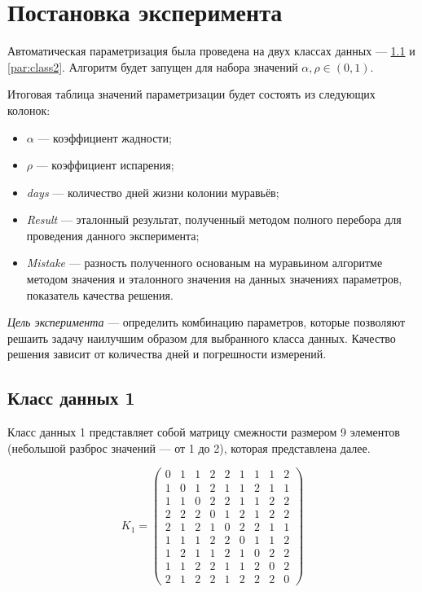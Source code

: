 \clearpage


\section{Постановка эксперимента}

Автоматическая параметризация была проведена на двух классах данных --- \ref{par:class1} и \ref{par:class2}. Алгоритм будет запущен для набора значений $\alpha, \rho \in (0, 1)$.

Итоговая таблица значений параметризации будет состоять из следующих колонок:
\begin{itemize}[label=---]
	\item $\alpha$ --- коэффициент жадности;
	\item $\rho$ --- коэффициент испарения;
	\item \textit{days} --- количество дней жизни колонии муравьёв;
	\item \textit{Result} --- эталонный результат, полученный методом полного перебора для проведения данного эксперимента;
	\item \textit{Mistake} --- разность полученного основаным на муравьином алгоритме методом значения и эталонного значения на данных значениях параметров, показатель качества решения.
\end{itemize}

\textit{Цель эксперимента} --- определить комбинацию параметров, которые позволяют решаить задачу наилучшим образом для выбранного класса данных. Качество решения зависит от количества дней и погрешности измерений.


\subsection{Класс данных 1}
\label{par:class1}

Класс данных 1 представляет собой матрицу смежности размером 9 элементов (небольшой разброс значений --- от 1 до 2), которая представлена далее.

\begin{equation}
	\label{eq:kd1}
	K_{1} = \begin{pmatrix}
		0 & 1 & 1 & 2 & 2 & 1 & 1 & 1 & 2 \\ 
		1 & 0 & 1 & 2 & 1 & 1 & 2 & 1 & 1 \\ 
		1 & 1 & 0 & 2 & 2 & 1 & 1 & 2 & 2 \\ 
		2 & 2 & 2 & 0 & 1 & 2 & 1 & 2 & 2 \\ 
		2 & 1 & 2 & 1 & 0 & 2 & 2 & 1 & 1 \\ 
		1 & 1 & 1 & 2 & 2 & 0 & 1 & 1 & 2 \\ 
		1 & 2 & 1 & 1 & 2 & 1 & 0 & 2 & 2 \\ 
		1 & 1 & 2 & 2 & 1 & 1 & 2 & 0 & 2 \\ 
		2 & 1 & 2 & 2 & 1 & 2 & 2 & 2 & 0 
	\end{pmatrix}
\end{equation}

